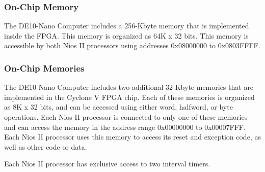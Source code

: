 \documentclass[11pt, twoside, pdftex]{article}
\newcommand{\commonFiles}{../../../common/doc}
\begin{document}


\subsubsection{On-Chip Memory}

The DE10-Nano Computer includes a 256-Kbyte memory that is implemented inside the FPGA.  This 
memory is organized as 64K {\sf x} 32 bits.  This memory is accessible by both Nios II
processors using addresses {\sf 0x08000000} to {\sf 0x0803FFFF}. 

\subsubsection{On-Chip Memories}
The DE10-Nano Computer includes two additional 32-Kbyte memories that are implemented in the
Cyclone V FPGA chip.  Each of these memories is organized as 8K {\sf x} 32 bits, and 
can be accessed using either word, halfword, or byte operations. Each Nios II processor is
connected to only one of these memories and can access the memory in the address range
{\sf 0x00000000} to {\sf 0x00007FFF}. Each Nios II processor uses this memory to access its
reset and exception code, as well as other code or data.














Each Nios II processor has exclusive access to two interval timers.





\end{document}
